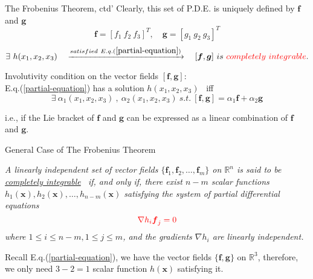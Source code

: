 \documentclass{beamer}
\renewcommand{\vec}[1]{\ensuremath{\boldsymbol{#1}}} %
\begin{document}
\begin{frame}{The Frobenius Theorem, ctd'}
    Clearly, this set of P.D.E. is uniquely defined by \vec{f} and \vec{g}
    $$
    \vec{f}=[f_{1}~f_{2}~f_{3}]^{T},\quad \vec{g}=[g_{1}~g_{2}~g_{3}]^{T}
    $$
    \vspace{-10pt}
    $$
    \exists ~h(x_{1},x_{2},x_{3}) \quad \xrightarrow{satisfied~E.q.(\ref{partial-equation})} \quad [\vec{f}, \vec{g}] ~is ~{\color{red}completely ~integrable}.
    $$

    {\color{red} Involutivity condition} on the vector fields $[\vec{f}, \vec{g}]$:\\
    E.q.(\ref{partial-equation}) has a solution $h(x_{1},x_{2},x_{3})$ ~iff
    $$\exists ~\alpha_{1}(x_{1},x_{2},x_{3})~,~\alpha_{2}(x_{1},x_{2},x_{3}) ~s.t.~[\vec{f},\vec{g}] = \alpha_{1}\vec{f}+\alpha_{2}\vec{g}$$

    i.e., if the Lie bracket of \vec{f} and \vec{g} can be expressed as a {\color{red}linear combination} of \vec{f} and \vec{g}.
\end{frame}


\begin{frame}{General Case of The Frobenius Theorem}
\begin{definition}[6.4]
\textit{A linearly independent set of vector fields $ \{ \vec{f}_{1}, \vec{f}_{2}, \dots, \vec{f}_{m} \} $ on $\mathbb{R}^{n}$ is said to be \underline{completely integrable}~ if, and only if, there exist {\color{red}$ n-m $} scalar functions $h_{1}(\vec{x}), h_{2}(\vec{x}), \dots , h_{n-m}(\vec{x})$ satisfying the system of partial differential equations
    \begin{equation}\label{differential-equation}
      {\color{red}\nabla h_{i}\vec{f}_{j} = 0}
    \end{equation}
    where $1 \leq i \leq n-m , 1 \leq j \leq m$, and the gradients $ \nabla h_{i} $ are linearly independent.}
\end{definition}

Recall E.q.(\ref{partial-equation}), we have the vector fields $\{ \vec{f}, \vec{g} \}$ on $\mathbb{R}^{3}$, therefore, we only need $3-2=1$ scalar function $h(\vec{x})$ satisfying it.
\end{frame}
\end{document}
